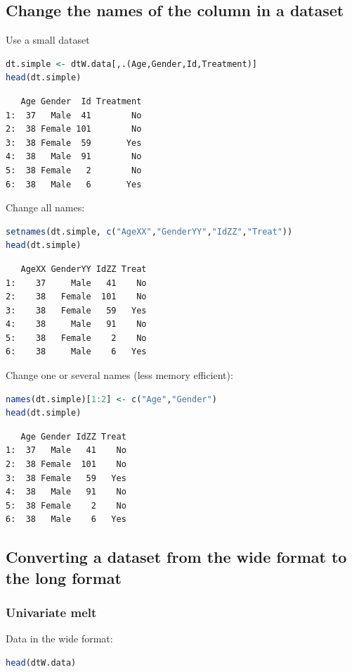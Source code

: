 \documentclass{article}
\begin{document}
\subsection{Change the names of the column in a dataset}
\label{sec:orgb6e0206}

Use a small dataset
\begin{lstlisting}[language=r,numbers=none]
dt.simple <- dtW.data[,.(Age,Gender,Id,Treatment)]
head(dt.simple)
\end{lstlisting}

\label{}
\begin{verbatim}
   Age Gender  Id Treatment
1:  37   Male  41        No
2:  38 Female 101        No
3:  38 Female  59       Yes
4:  38   Male  91        No
5:  38 Female   2        No
6:  38   Male   6       Yes
\end{verbatim}


Change all names:
\begin{lstlisting}[language=r,numbers=none]
setnames(dt.simple, c("AgeXX","GenderYY","IdZZ","Treat"))
head(dt.simple)
\end{lstlisting}

\label{}
\begin{verbatim}
   AgeXX GenderYY IdZZ Treat
1:    37     Male   41    No
2:    38   Female  101    No
3:    38   Female   59   Yes
4:    38     Male   91    No
5:    38   Female    2    No
6:    38     Male    6   Yes
\end{verbatim}


Change one or several names (less memory efficient):
\begin{lstlisting}[language=r,numbers=none]
names(dt.simple)[1:2] <- c("Age","Gender")
head(dt.simple)
\end{lstlisting}

\label{}
\begin{verbatim}
   Age Gender IdZZ Treat
1:  37   Male   41    No
2:  38 Female  101    No
3:  38 Female   59   Yes
4:  38   Male   91    No
5:  38 Female    2    No
6:  38   Male    6   Yes
\end{verbatim}
\subsection{Converting a dataset from the wide format to the long format}
\label{sec:orge21fb10}
\subsubsection{Univariate melt}
\label{sec:orgef84ff4}
Data in the wide format:
\begin{lstlisting}[language=r,numbers=none]
head(dtW.data)
\end{lstlisting}
\end{document}
